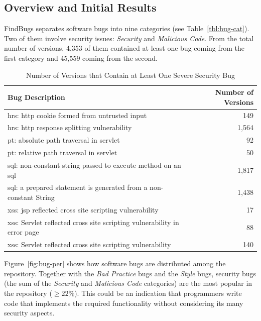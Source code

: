 \documentclass[conference]{llncs}
\begin{document}
\subsection{Overview and Initial Results}
\label{sec:overview}

FindBugs separates software bugs into nine categories (see
Table~\ref{tbl:bug-cat}). Two of them involve security issues: {\it Security} and {\it
Malicious Code}. From the total number of versions, 4,353 of them contained
at least one bug coming from the first category
and 45,559 coming from the second.

\begin{table}
\centering
\caption{Number of Versions that Contain at Least One Severe Security Bug}
\label{tbl:sev}
\leavevmode
	\begin{tabular}{l r}
	\hline
	Bug Description & Number of Versions\\
 	\hline
	{\sc hrs}: {\sc http} cookie formed from untrusted input & 149\\
	{\sc hrs}: {\sc http} response splitting vulnerability & 1,564\\
	{\sc pt}: absolute path traversal in servlet  & 92\\
	{\sc pt}: relative path traversal in servlet & 50\\
	{\sc sql}: non-constant string passed to execute method on an {\sc sql} & 1,817\\
	{\sc sql}: a prepared statement is generated from a non-constant String & 1,438\\
	{\sc xss}: {\sc jsp} reflected cross site scripting vulnerability & 17\\
	{\sc xss}: Servlet reflected cross site scripting vulnerability in error page & 88\\
	{\sc xss}: Servlet reflected cross site scripting vulnerability & 140\\
	\hline
	\end{tabular}
\end{table}

Figure~\ref{fig:bug-per} shows how software bugs are distributed among the
repository. Together with the {\it Bad Practice} bugs and the {\it Style} bugs,
security bugs (the sum of the {\it Security} and {\it Malicious Code}
categories) are the most popular in the repository ($\geq 22\%$).
This could be an indication that programmers write code that implements the
required functionality without considering its many security aspects.
\end{document}
